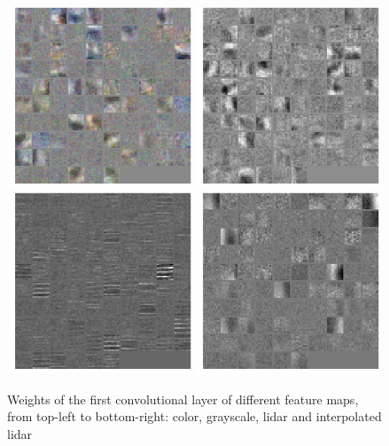 \begin{figure}[t]
\centering
\includegraphics[width=0.49\textwidth]{images/grp0_conv1_weights_color.png}
\includegraphics[width=0.49\textwidth]{images/grp0_conv1_weights_gray.png}
\includegraphics[width=0.49\textwidth]{images/grp0_conv1_weights_lid.png}
\includegraphics[width=0.49\textwidth]{images/grp0_conv1_weights_lid_depth.png}
\caption{Weights of the first convolutional layer of different feature maps, from top-left to bottom-right: color, grayscale, lidar and interpolated lidar}
\label{fig:filters}
\end{figure}

